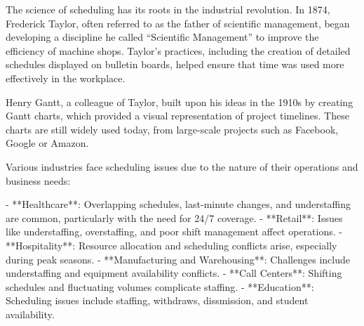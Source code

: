 %
%
The science of scheduling has its roots in the industrial revolution. In 1874, Frederick Taylor, often referred to as the father of scientific management, began developing a discipline he called “Scientific Management” to improve the efficiency of machine shops. Taylor’s practices, including the creation of detailed schedules displayed on bulletin boards, helped ensure that time was used more effectively in the workplace.

Henry Gantt, a colleague of Taylor, built upon his ideas in the 1910s by creating Gantt charts, which provided a visual representation of project timelines. These charts are still widely used today, from large-scale projects such as Facebook, Google or Amazon.


Various industries face scheduling issues due to the nature of their operations and business needs:

- **Healthcare**: Overlapping schedules, last-minute changes, and understaffing are common, particularly with the need for 24/7 coverage.
- **Retail**: Issues like understaffing, overstaffing, and poor shift management affect operations.
- **Hospitality**: Resource allocation and scheduling conflicts arise, especially during peak seasons.
- **Manufacturing and Warehousing**: Challenges include understaffing and equipment availability conflicts.
- **Call Centers**: Shifting schedules and fluctuating volumes complicate staffing.
- **Education**: Scheduling issues include staffing, withdraws, dissmission, and student availability.


